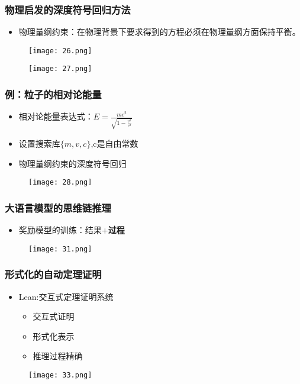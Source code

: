 \documentclass[CJK,aspectratio=169]{beamer}  %
\begin{document}
	\begin{frame}
		\frametitle{物理启发的深度符号回归方法}
		\begin{itemize}
			\item 物理量纲约束：在物理背景下要求得到的方程必须在物理量纲方面保持平衡。
			
		\end{itemize}
		\begin{figure}
			\centering 
			\texttt{[image: 26.png]}
		\end{figure}
	\end{frame}
	\begin{frame}
		\begin{figure}
			\centering 
			\texttt{[image: 27.png]}
		\end{figure}
	\end{frame}
	\begin{frame}
		\frametitle{例：粒子的相对论能量}
		\begin{itemize}
			\item 相对论能量表达式：$E=\frac{m c^2}{\sqrt{1-\frac{v^2}{c^2}}}$
			\item 设置搜索库$\{m,v,c\}$,c是自由常数
			\item 物理量纲约束的深度符号回归
		\end{itemize}
		\begin{figure}
			\centering
			\texttt{[image: 28.png]}
		\end{figure}
	\end{frame}
	\begin{frame}
		\frametitle{大语言模型的思维链推理}
		\begin{itemize}
			\item 奖励模型的训练：结果+\textbf{过程}
		\end{itemize}
		\begin{figure}
			\centering
			\texttt{[image: 31.png]}
		\end{figure}
	\end{frame}
	\begin{frame}
		\frametitle{形式化的自动定理证明}
		\begin{itemize}
			\item Lean:交互式定理证明系统
			\begin{itemize}
				\item 交互式证明
				\item 形式化表示
				\item 推理过程精确
			\end{itemize}
		\end{itemize}
		\begin{figure}
			\centering
			\texttt{[image: 33.png]}
		\end{figure}
	\end{frame}
\end{document}
